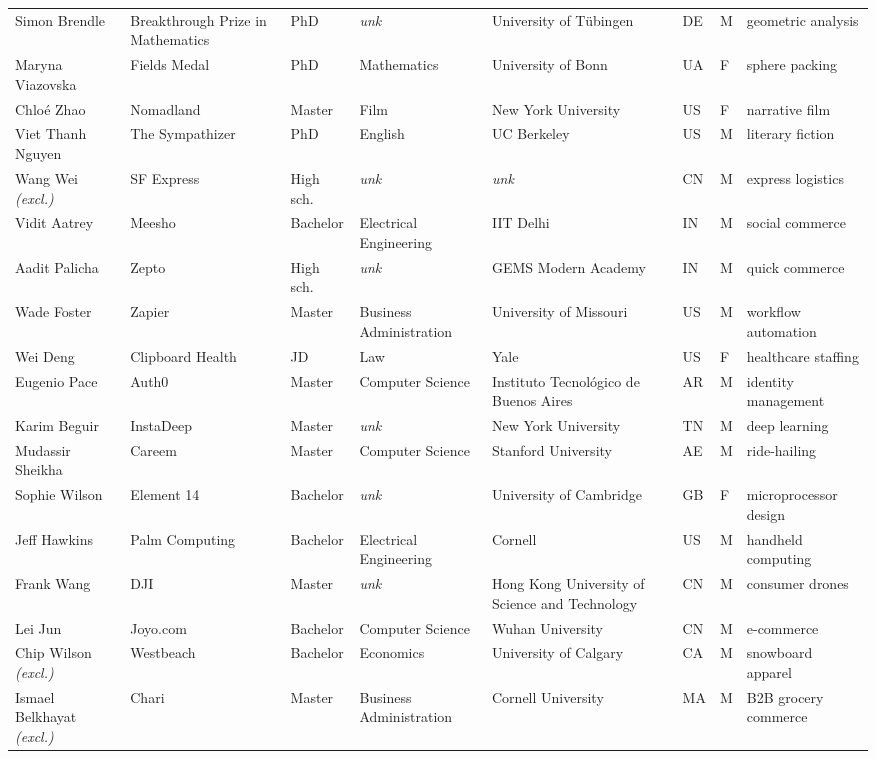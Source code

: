 \documentclass[11pt]{article}
\begin{document}
\begin{longtable}{@{}p{2.4cm}p{2.5cm}p{1.35cm}p{1.9cm}p{2.1cm}p{0.5cm}p{0.45cm}p{2.2cm}@{}}
Simon Brendle & Breakthrough Prize in Mathematics & PhD & \textit{unk} & University of Tübingen & DE & M & geometric analysis \\
Maryna Viazovska & Fields Medal & PhD & Mathematics & University of Bonn & UA & F & sphere packing \\
Chloé Zhao & Nomadland & Master & Film & New York University & US & F & narrative film \\
Viet Thanh Nguyen & The Sympathizer & PhD & English & UC Berkeley & US & M & literary fiction \\
Wang Wei \textit{\scriptsize(excl.)} & SF Express & High sch. & \textit{unk} & \textit{unk} & CN & M & express logistics \\
Vidit Aatrey & Meesho & Bachelor & Electrical Engineering & IIT Delhi & IN & M & social commerce \\
Aadit Palicha & Zepto & High sch. & \textit{unk} & GEMS Modern Academy & IN & M & quick commerce \\
Wade Foster & Zapier & Master & Business Administration & University of Missouri & US & M & workflow automation \\
Wei Deng & Clipboard Health & JD & Law & Yale & US & F & healthcare staffing \\
Eugenio Pace & Auth0 & Master & Computer Science & Instituto Tecnológico de Buenos Aires & AR & M & identity management \\
Karim Beguir & InstaDeep & Master & \textit{unk} & New York University & TN & M & deep learning \\
Mudassir Sheikha & Careem & Master & Computer Science & Stanford University & AE & M & ride-hailing \\
Sophie Wilson & Element 14 & Bachelor & \textit{unk} & University of Cambridge & GB & F & microprocessor design \\
Jeff Hawkins & Palm Computing & Bachelor & Electrical Engineering & Cornell & US & M & handheld computing \\
Frank Wang & DJI & Master & \textit{unk} & Hong Kong University of Science and Technology & CN & M & consumer drones \\
Lei Jun & Joyo.com & Bachelor & Computer Science & Wuhan University & CN & M & e-commerce \\
Chip Wilson \textit{\scriptsize(excl.)} & Westbeach & Bachelor & Economics & University of Calgary & CA & M & snowboard apparel \\
Ismael Belkhayat \textit{\scriptsize(excl.)} & Chari & Master & Business Administration & Cornell University & MA & M & B2B grocery commerce \\

\end{longtable}
\end{document}
